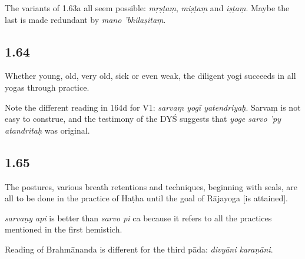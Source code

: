 \begin{ekdosis}
\begin{philcomm}[hp01_063]
The variants of 1.63a all seem possible: \emph{mṛṣṭaṃ}, \emph{miṣṭaṃ} and \emph{iṣṭaṃ}. Maybe the last is made redundant by \emph{mano 'bhilaṣitaṃ}.
\end{philcomm}

\subsection*{1.64}
\begin{translation}[hp01_064]
Whether young, old, very old, sick or even weak, the diligent yogi succeeds in all yogas through practice. 
\end{translation}

\begin{philcomm}[hp01_064]
Note the different reading in 164d for V1: \emph{sarvaṃ yogī yatendriyaḥ}. Sarvaṃ is not easy to construe, and the testimony of the DYŚ suggests that \emph{yoge sarvo ’py atandritaḥ} was original.
\end{philcomm}

\subsection*{1.65}
\begin{translation}[hp01_065]
The postures, various breath retentions and techniques, beginning with seals, are all to be done in the practice of Haṭha until the goal of Rājayoga [is attained].
\end{translation}

\begin{philcomm}[hp01_065]
\emph{sarvaṇy api} is better than \emph{sarvo pi} ca because it refers to all the practices mentioned in the first hemistich. 

Reading of Brahmānanda is different for the third pāda: \emph{divyāni karaṇāni}.
\end{philcomm}

\end{ekdosis}
